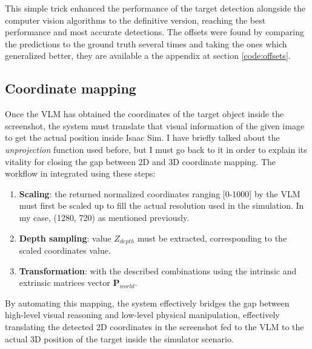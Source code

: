 This simple trick enhanced the performance of the target detection alongside the computer vision algorithms to the definitive version, reaching the best performance and most accurate detections. The offsets were found by comparing the predictions to the ground truth several times and taking the ones which generalized better, they are available a the appendix at section \ref{code:offsets}.

\subsection{Coordinate mapping} %
Once the VLM has obtained the coordinates of the target object inside the screenshot, the system must translate that visual information of the given image to get the actual position inside Isaac Sim. I have briefly talked about the \textit{unprojection} function used before, but I must go back to it in order to explain its vitality for closing the gap between 2D and 3D coordinate mapping. The workflow in integrated using these steps:

\begin{enumerate}
	\item \textbf{Scaling}: the returned normalized coordinates ranging [0-1000] by the VLM must first be scaled up to fill the actual resolution used in the simulation. In my case, (1280, 720) as mentioned previously. 
	
	\item \textbf{Depth sampling}: value $Z_{depth}$ must be extracted, corresponding to the scaled coordinates value.
	
	\item \textbf{Transformation}: with the described combinations using the intrinsic and extrinsic matrices vector $\mathbf{P}_{world}$.
\end{enumerate}

By automating this mapping, the system effectively bridges the gap between high-level visual reasoning and low-level physical manipulation, effectively translating the detected 2D coordinates in the screenshot fed to the VLM to the actual 3D position of the target inside the simulator scenario.


